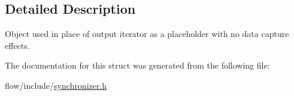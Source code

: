 \subsection{Detailed Description}
Object used in place of output iterator as a placeholder with no data capture effects. 

The documentation for this struct was generated from the following file\+:\begin{DoxyCompactItemize}
\item 
flow/include/\hyperlink{synchronizer_8h}{synchronizer.\+h}\end{DoxyCompactItemize}
